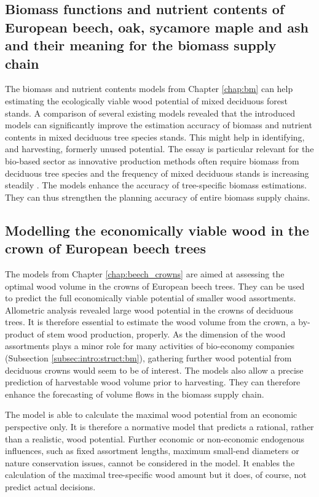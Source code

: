\subsection{Biomass functions and nutrient contents of European beech, oak, sycamore maple and ash and their meaning for the biomass supply chain}
\label{subsec:discussion:struct:bm}
The biomass and nutrient contents models from Chapter \ref{chap:bm} can help estimating the ecologically viable wood potential of mixed deciduous forest stands. A comparison of several existing models revealed that the introduced models can significantly improve the estimation accuracy of biomass and nutrient contents in mixed deciduous tree species stands. This might help in identifying, and harvesting, formerly unused potential. The essay is particular relevant for the bio-based sector as innovative production methods often require biomass from deciduous tree species \citep[p. 1]{auer_2016} and the frequency of mixed deciduous stands is increasing steadily \citep{ti_2014}. The models enhance the accuracy of tree-specific biomass estimations. They can thus strengthen the planning accuracy of entire biomass supply chains.

\subsection{Modelling the economically viable wood in the crown of European beech trees}
\label{subsec:discussion:struct:beech_crowns}
The models from Chapter \ref{chap:beech_crowns} are aimed at assessing the optimal wood volume in the crowns of European beech trees. They can be used to predict the full economically viable potential of smaller wood assortments. Allometric analysis revealed large wood potential in the crowns of deciduous trees. It is therefore essential to estimate the wood volume from the crown, a by-product of stem wood production, properly. As the dimension of the wood assortments plays a minor role for many activities of bio-economy companies (Subsection \ref{subsec:intro:struct:bm}), gathering further wood potential from deciduous crowns would seem to be of interest. The models also allow a precise prediction of harvestable wood volume prior to harvesting. They can therefore enhance the forecasting of volume flows in the biomass supply chain.

The model is able to calculate the maximal wood potential from an economic perspective only. It is therefore a normative model that predicts a rational, rather than a realistic, wood potential. Further economic or non-economic endogenous influences, such as fixed assortment lengths, maximum small-end diameters or nature conservation issues, cannot be considered in the model. It enables the calculation of the maximal tree-specific wood amount but it does, of course, not predict actual decisions.

